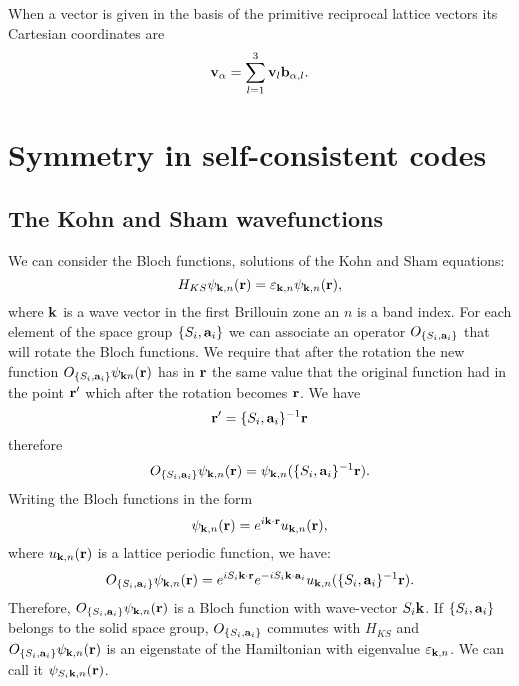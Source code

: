 \documentclass[12pt,a4paper,twoside]{report}
\begin{document}
When a vector is given in the basis of the primitive reciprocal lattice vectors its Cartesian coordinates are
\begin{equation}
{\bf v}_\alpha= \sum_{l=1}^3 {\bf v}_l {\bf b}_{\alpha,l}.
\end{equation}

{\color{dark-blue}\chapter{Symmetry in self-consistent codes}}
\color{black}

\section{The Kohn and Sham wavefunctions}

We can consider the Bloch functions, solutions of the Kohn and Sham equations:
\begin{equation}
H_{KS} \psi_{{\bf k}, n}({\bf r})= \varepsilon_{{\bf k}, n}\psi_{{\bf k}, n} ({\bf r}),
\end{equation}
where ${\bf k}$ is a wave vector in the first Brillouin zone an $n$ is a band index.
For each element of the space group $\{S_i,{\bf a}_i\}$ we can associate an operator $O_{\{S_i,{\bf a}_i\}}$ that will rotate the Bloch functions. We require that after the rotation the new function $O_{\{S_i,{\bf a}_i\}} \psi_{{\bf k} n} ({\bf r})$ has in ${\bf r}$ the same value that the original function had in the point
${\bf r}'$ which after the rotation becomes ${\bf r}$.
We have 
\begin{equation}
{\bf r}'= \{S_i,{\bf a}_i\}^{-1} {\bf r}
\end{equation}
therefore
\begin{equation}
O_{\{S_i,{\bf a}_i\}} \psi_{{\bf k}, n} ({\bf r}) =
\psi_{{\bf k}, n} (\{S_i,{\bf a}_i\}^{-1} {\bf r}).
\end{equation}
Writing the Bloch functions in the form
\begin{equation}
\psi_{{\bf k}, n} ({\bf r}) = e^{i{\bf k} \cdot {\bf r}} u_{{\bf k}, n} ({\bf r}),
\end{equation}
where $u_{{\bf k}, n} ({\bf r})$ is a lattice periodic function, we have:
\begin{equation}
O_{\{S_i,{\bf a}_i\}} \psi_{{\bf k}, n} ({\bf r})
= e^{iS_i{\bf k} \cdot {\bf r}}e^{-iS_i{\bf k} \cdot {\bf a}_i} u_{{\bf k}, n} (\{S_i,{\bf a}_i\}^{-1} {\bf r}).
\label{psisik}
\end{equation}
Therefore, $O_{\{S_i,{\bf a}_i\}} \psi_{{\bf k}, n} ({\bf r})$ is a Bloch function with wave-vector $S_i {\bf k}$.
If $\{S_i,{\bf a}_i\}$ belongs to the solid space group, $O_{\{S_i,{\bf a}_i\}}$ commutes with $H_{KS}$
and $O_{\{S_i,{\bf a}_i\}} \psi_{{\bf k}, n} ({\bf r})$
is an eigenstate of the Hamiltonian with
eigenvalue $\varepsilon_{{\bf k}, n}$. We can call it $\psi_{S_i {\bf k},n} ({\bf r})$.
\end{document}
